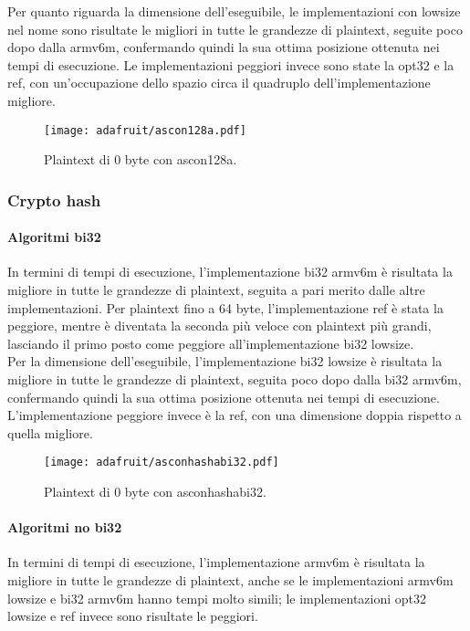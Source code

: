 \noindent Per quanto riguarda la dimensione dell'eseguibile, le implementazioni con lowsize nel nome sono risultate le migliori in tutte le grandezze di plaintext, seguite poco dopo dalla armv6m, confermando quindi la sua ottima posizione ottenuta nei tempi di esecuzione. Le implementazioni peggiori invece sono state la opt32 e la ref, con un'occupazione dello spazio circa il quadruplo dell'implementazione migliore.

\begin{figure}[H]
    \centering
    \texttt{[image: adafruit/ascon128a.pdf]}
    \caption{Plaintext di 0 byte con ascon128a.}
\end{figure}

\subsubsection{Crypto hash}

\paragraph{Algoritmi bi32}

In termini di tempi di esecuzione, l'implementazione bi32 armv6m è risultata la migliore in tutte le grandezze di plaintext, seguita a pari merito dalle altre implementazioni. Per plaintext fino a 64 byte, l'implementazione ref è stata la peggiore, mentre è diventata la seconda più veloce con plaintext più grandi, lasciando il primo posto come peggiore all'implementazione bi32 lowsize. \\

\noindent Per la dimensione dell'eseguibile, l'implementazione bi32 lowsize è risultata la migliore in tutte le grandezze di plaintext, seguita poco dopo dalla bi32 armv6m, confermando quindi la sua ottima posizione ottenuta nei tempi di esecuzione. L'implementazione peggiore invece è la ref, con una dimensione doppia rispetto a quella migliore.

\begin{figure}[H]
    \centering
    \texttt{[image: adafruit/asconhashabi32.pdf]}
    \caption{Plaintext di 0 byte con asconhashabi32.}
\end{figure}

\paragraph{Algoritmi no bi32}

In termini di tempi di esecuzione, l'implementazione armv6m è risultata la migliore in tutte le grandezze di plaintext, anche se le implementazioni armv6m lowsize e bi32 armv6m hanno tempi molto simili; le implementazioni opt32 lowsize e ref invece sono risultate le peggiori. \\

